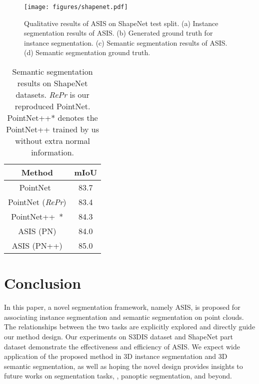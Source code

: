 \documentclass[10pt,twocolumn,letterpaper]{article}
\begin{document}
\begin{figure}[!tb]
\texttt{[image: figures/shapenet.pdf]}
\caption{Qualitative results of ASIS on ShapeNet test split. (a) Instance segmentation results of ASIS. (b) Generated ground truth for instance segmentation. (c) Semantic segmentation results of ASIS. (d) Semantic segmentation ground truth.}
\label{fig:shapenet}
\vspace{-0.2cm}
\end{figure}


\begin{table}[!ht]
\small
\begin{center}
\begin{tabular}{c|c}
\hline 
\hline
 Method       & mIoU \\
\hline
PointNet~\cite{Qi_2017_CVPR} &  83.7 \\
PointNet (\textit{RePr}) &  83.4 \\
PointNet++~\cite{qi2017pointnet++}* &  84.3 \\
\hline
ASIS (PN) &   84.0 \\
ASIS (PN++) &  85.0 \\
\hline
\end{tabular}
\end{center}
\vspace{-0.3cm}
\caption{Semantic segmentation results on ShapeNet datasets. \textit{RePr} is our reproduced PointNet. PointNet++* denotes the PointNet++ trained by us without extra normal information.}
\label{tab:shapenet_sem_results}
\end{table}


\section{Conclusion}
    In this paper, a novel segmentation framework, namely ASIS, is proposed for associating  instance segmentation and semantic segmentation on point clouds.
    The relationships between the two tasks are explicitly explored and directly guide our method design.
    Our experiments on S3DIS dataset and ShapeNet part dataset demonstrate the effectiveness and efficiency of ASIS.    
    We expect wide application of the proposed method in 3D instance segmentation and 3D semantic segmentation, as well as hoping the novel design provides insights to future works on segmentation tasks, \eg, panoptic segmentation, and beyond.




{\small


}
\end{document}
